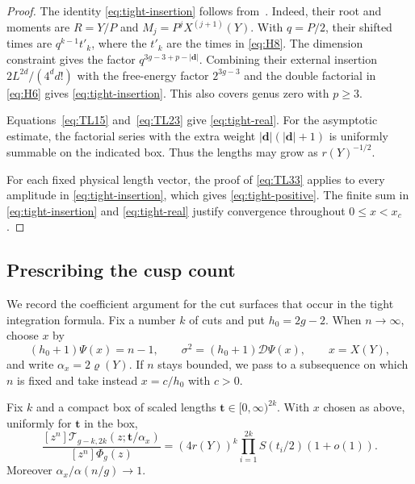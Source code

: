 \begin{proof}
The identity \eqref{eq:tight-insertion} follows from~\cite[Proposition~12]{BZ}. Indeed, their root and
moments are $R=Y/P$ and $M_j=P^jX^{(j+1)}(Y)$. With $q=P/2$,
their shifted times are $q^{k-1}t'_k$, where the $t'_k$ are the
times in \eqref{eq:H8}. The dimension constraint gives the factor
$q^{3g-3+p-|\mathbf d|}$. Combining their external insertion
$2L^{2d}/(4^d d!)$ with the free-energy factor $2^{3g-3}$ and
the double factorial in \eqref{eq:H6} gives
\eqref{eq:tight-insertion}. This also covers genus zero with $p\ge3$.

Equations~\eqref{eq:TL15} and~\eqref{eq:TL23} give \eqref{eq:tight-real}. For
the asymptotic estimate,
the factorial series with the extra weight
$|\mathbf d|(|\mathbf d|+1)$ is uniformly summable on the indicated
box. Thus the lengths may grow as $r(Y)^{-1/2}$.

For each fixed physical length vector, the proof of
\eqref{eq:TL33} applies to every amplitude in
\eqref{eq:tight-insertion}, which gives \eqref{eq:tight-positive}. The
finite sum in \eqref{eq:tight-insertion} and \eqref{eq:tight-real} justify
convergence throughout $0\le x<x_c$.
\end{proof}

\subsection{Prescribing the cusp count}\label{subsec:tight-count}

We record the coefficient argument for the cut surfaces that occur in
the tight integration formula. Fix a number $k$ of cuts and put
$h_0=2g-2$. When $n\to\infty$, choose $x$ by
\[
 (h_0+1)\Psi(x)=n-1,\qquad
 \sigma^2=(h_0+1)\mathscr D\Psi(x),\qquad x=X(Y),
\]
and write $\alpha_x=2\varrho(Y)$. If $n$ stays bounded, we pass to a
subsequence on which $n$ is fixed and take instead $x=c/h_0$ with $c>0$.

\begin{lemma}\label{lem:tight-connected}
Fix $k$ and a compact box of scaled lengths $\mathbf t\in[0,\infty)^{2k}$.
With $x$ chosen as above, uniformly for $\mathbf t$ in the box,
\begin{equation}
 \frac{[z^n]\mathscr T_{g-k,2k}(z;\mathbf t/\alpha_x)}
      {[z^n]\Phi_g(z)}
 =(4r(Y))^k\prod_{i=1}^{2k}S(t_i/2)(1+o(1)).
 \label{eq:tight-connected}
\end{equation}
Moreover $\alpha_x/\alpha(n/g)\to1$.
\end{lemma}

